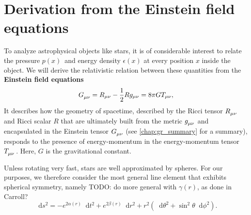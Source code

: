\documentclass[a4paper,11pt,twoside]{report}
\newcommand\dif{\mathop{}\!\mathrm{d}}
\begin{document}
\section{Derivation from the Einstein field equations}

To analyze astrophysical objects like stars, it is of considerable interest to relate the pressure $p(x)$ and energy density $\epsilon(x)$ at every position $x$ inside the object.
We will derive the relativistic relation between these quantities from the \textbf{Einstein field equations} \cite[equation 4.44]{ref:carroll}
\begin{equation}
	G\indices{_\mu_\nu} = R_{\mu \nu} - \frac{1}{2} R g_{\mu \nu} = 8 \pi G T_{\mu \nu} ,
	\label{eq:einstein}
\end{equation}
It describes how the geometry of spacetime, described by the Ricci tensor $R\indices{_\mu_\nu}$ and Ricci scalar $R$ that are ultimately built from the metric $g\indices{_\mu_\nu}$ and encapsulated in the Einstein tensor $G\indices{_\mu_\nu}$ (see \cref{chap:gr_summary} for a summary), responds to the presence of energy-momentum in the energy-momentum tensor $T\indices{_\mu_\nu}$.
Here, $G$ is the gravitational constant.

Unless rotating very fast, stars are well approximated by spheres.
For our purposes, we therefore consider the most general line element that exhibits spherical symmetry, namely \cite[§ 94-95]{ref:tolman}
TODO: do more general with $\gamma(r)$, as done in Carroll?
\begin{equation}
	\dif s^2 = -e^{2 \alpha(r)} \dif t^2 + e^{2 \beta(r)} \dif r^2 + r^2 \left( \dif \theta^2 + \sin^2 \theta \dif \phi^2 \right) .
\end{equation}
\end{document}

